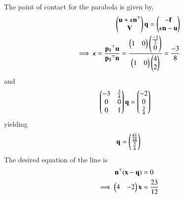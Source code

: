 The  point of contact for the parabola is given by,
\begin{align}
    \begin{pmatrix}\mathbf{u}+\kappa \mathbf{n}^{\top} \\ \mathbf{V} \end{pmatrix}\mathbf{q} 
    = \begin{pmatrix}\mathbf{-f}\\\kappa \mathbf{n} -\mathbf{u}\end{pmatrix}
    \\
  \implies \kappa =\frac{\mathbf{p_{1}}^{\top}\mathbf{u}}{\mathbf{p_{1}}^{\top}\mathbf{n}}
    =\frac{\begin{pmatrix}1&0\end{pmatrix}\begin{pmatrix}\frac{-3}{2} \\ 0\end{pmatrix}}{\begin{pmatrix}1&0\end{pmatrix}\begin{pmatrix}4 \\ 2\end{pmatrix}}
    =\frac{-3}{8}
    \end{align}
and 
\begin{align}
    \begin{pmatrix}-3&\frac{3}{4} \\ 0&0 \\ 0&1\end{pmatrix} \mathbf{q}&= \begin{pmatrix}-2 \\ 0 \\ \frac{3}{4}\end{pmatrix}
\end{align}
yielding 
\begin{align}
    \mathbf{q}=\begin{pmatrix}\frac{41}{48} \\ \frac{3}{4}\end{pmatrix}
\end{align}
The desired equation of the line is 
\begin{align}
    \mathbf{n}^{\top}(\mathbf{x}-\mathbf{q}) &= 0\label{quadform/82/eq:eqn6}
    \\
\implies     \begin{pmatrix}4&-2\end{pmatrix}\mathbf{x}&=\frac{23}{12} \label{quadform/82/eq:eqn7}
\end{align}
